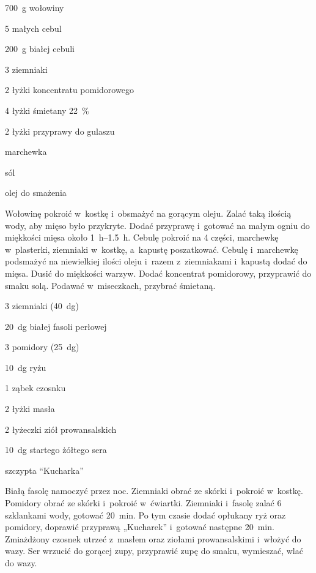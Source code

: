 \documentclass[../main.tex]{subfiles}
\begin{document}

\begin{Ingred}
    \item \qty{700}{\gram} wołowiny
    \item \num{5} małych cebul
    \item \qty{200}{\gram} białej cebuli
    \item \num{3} ziemniaki
    \item \num{2} łyżki koncentratu pomidorowego
    \item \num{4} łyżki śmietany \qty{22}{\percent}
    \item \num{2} łyżki przyprawy do gulaszu
    \item marchewka
    \item sól
    \item olej do smażenia
\end{Ingred}

Wołowinę pokroić w~kostkę i~obsmażyć na gorącym oleju. Zalać taką ilością wody,
aby mięso było przykryte. Dodać przyprawę i~gotować na małym ogniu do miękkości
mięsa około \qtyrange{1}{1.5}{\hour}. Cebulę pokroić na \num{4} części,
marchewkę w~plasterki, ziemniaki w~kostkę, a~kapustę poszatkować. Cebulę
i~marchewkę podsmażyć na niewielkiej ilości oleju i~razem z~ziemniakami
i~kapustą dodać do mięsa. Dusić do miękkości warzyw. Dodać koncentrat
pomidorowy, przyprawić do smaku solą. Podawać w~miseczkach, przybrać śmietaną.


\begin{Ingred}
    \item \num{3} ziemniaki (\qty{40}{\deca\gram})
    \item \qty{20}{\deca\gram} białej fasoli perłowej
    \item \num{3} pomidory (\qty{25}{\deca\gram})
    \item \qty{10}{\deca\gram} ryżu
    \item \num{1} ząbek czosnku
    \item \num{2} łyżki masła
    \item \num{2} łyżeczki ziół prowansalskich
    \item \qty{10}{\deca\gram} startego żółtego sera
    \item szczypta \enquote{Kucharka}
\end{Ingred}

Białą fasolę namoczyć przez noc. Ziemniaki obrać ze skórki i~pokroić w~kostkę.
Pomidory obrać ze skórki i~pokroić w~ćwiartki. Ziemniaki i~fasolę zalać \num{6}
szklankami wody, gotować \qty{20}{\minute}. Po tym czasie dodać opłukany ryż
oraz pomidory, doprawić przyprawą „Kucharek” i~gotować następne
\qty{20}{\minute}. Zmiażdżony czosnek utrzeć z~masłem oraz ziołami
prowansalskimi i~włożyć do wazy. Ser wrzucić do gorącej zupy, przyprawić zupę
do smaku, wymieszać, wlać do wazy.
\end{document}

